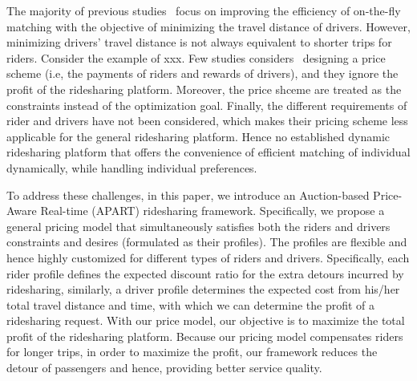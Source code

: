 
The majority of previous studies~\cite{} focus on improving the efficiency of on-the-fly matching with the objective of minimizing the travel distance of drivers. However, minimizing drivers' travel distance is not always equivalent to shorter trips for riders. Consider the example of xxx. Few studies considers~\cite{} designing a price scheme (i.e, the payments of riders and rewards of drivers), and they ignore the profit of the ridesharing platform. Moreover, the price shceme are treated as the constraints instead of the optimization goal. Finally, the different requirements of rider and drivers have not been considered, which makes their pricing scheme less applicable for the general ridesharing platform. Hence no established dynamic ridesharing platform that offers the convenience of efficient matching of individual dynamically, while handling individual preferences. 


To address these challenges, in this paper, we introduce an Auction-based Price-Aware Real-time (APART) ridesharing framework. Specifically, we propose a general pricing model that simultaneously satisfies both the riders and drivers constraints and desires (formulated as their profiles). The profiles are  flexible and hence highly customized for different types of riders and drivers. Specifically, each rider profile defines the expected discount ratio for the extra detours incurred by ridesharing, similarly, a driver profile determines the expected cost from his/her total travel distance and time, with which we can determine the profit of a ridesharing request. With our price model, our objective is to maximize the total profit of the ridesharing platform. Because our pricing model compensates riders for longer trips, in order to maximize the profit, our framework reduces the detour of passengers and hence, providing better service quality. 

